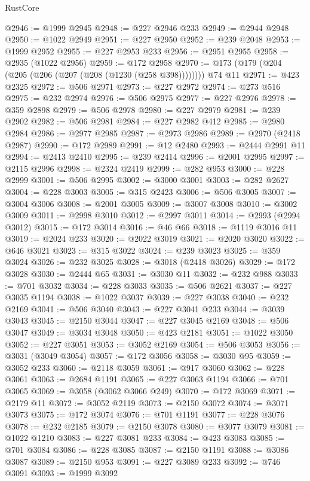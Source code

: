 \begin{lexlean}{RustCore}
\begin{coremodule}
@2946 := @1999 @2945
@2948 := @227 @2946 @233
@2949 := @2944 @2948
@2950 := @1022 @2949
@2951 := @227 @2950
@2952 := @239 @2048
@2953 := @1999 @2952
@2955 := @227 @2953 @233
@2956 := @2951 @2955
@2958 := @2935 (@1022 @2956)
@2959 := @172 @2958
@2970 := @173 (@179 (@204 (@205 (@206 (@207 (@208 (@1230 (@258 @398)))))))) @74 @11
@2971 := @423 @2325
@2972 := @506 @2971
@2973 := @227 @2972
@2974 := @273 @516
@2975 := @232 @2974
@2976 := @506 @2975
@2977 := @227 @2976
@2978 := @359 @2898
@2979 := @506 @2978
@2980 := @227 @2979
@2981 := @239 @2902
@2982 := @506 @2981
@2984 := @227 @2982 @412
@2985 := @2980 @2984
@2986 := @2977 @2985
@2987 := @2973 @2986
@2989 := @2970 (@2418 @2987)
@2990 := @172 @2989
@2991 := @12 @2480
@2993 := @2444 @2991 @11
@2994 := @2413 @2410
@2995 := @239 @2414
@2996 := @2001 @2995
@2997 := @2115 @2996
@2998 := @2324 @2419
@2999 := @282 @953
@3000 := @228 @2999
@3001 := @506 @2995
@3002 := @3000 @3001
@3003 := @282 @2627
@3004 := @228 @3003
@3005 := @315 @2423
@3006 := @506 @3005
@3007 := @3004 @3006
@3008 := @2001 @3005
@3009 := @3007 @3008
@3010 := @3002 @3009
@3011 := @2998 @3010
@3012 := @2997 @3011
@3014 := @2993 (@2994 @3012)
@3015 := @172 @3014
@3016 := @46 @66
@3018 := @1119 @3016 @11
@3019 := @2024 @233
@3020 := @2022 @3019
@3021 := @2020 @3020
@3022 := @646 @3021
@3023 := @315 @3022
@3024 := @239 @3023
@3025 := @359 @3024
@3026 := @232 @3025
@3028 := @3018 (@2418 @3026)
@3029 := @172 @3028
@3030 := @2444 @65
@3031 := @3030 @11
@3032 := @232 @988
@3033 := @701 @3032
@3034 := @228 @3033
@3035 := @506 @2621
@3037 := @227 @3035 @1194
@3038 := @1022 @3037
@3039 := @227 @3038
@3040 := @232 @2169
@3041 := @506 @3040
@3043 := @227 @3041 @233
@3044 := @3039 @3043
@3045 := @2150 @3044
@3047 := @227 @3045 @2169
@3048 := @506 @3047
@3049 := @3034 @3048
@3050 := @423 @2181
@3051 := @1022 @3050
@3052 := @227 @3051
@3053 := @3052 @2169
@3054 := @506 @3053
@3056 := @3031 (@3049 @3054)
@3057 := @172 @3056
@3058 := @3030 @95
@3059 := @3052 @233
@3060 := @2118 @3059
@3061 := @917 @3060
@3062 := @228 @3061
@3063 := @2684 @1191
@3065 := @227 @3063 @1194
@3066 := @701 @3065
@3069 := @3058 (@3062 @3066 @249)
@3070 := @172 @3069
@3071 := @2179 @11
@3072 := @3052 @2119
@3073 := @2150 @3072
@3074 := @3071 @3073
@3075 := @172 @3074
@3076 := @701 @1191
@3077 := @228 @3076
@3078 := @232 @2185
@3079 := @2150 @3078
@3080 := @3077 @3079
@3081 := @1022 @1210
@3083 := @227 @3081 @233
@3084 := @423 @3083
@3085 := @701 @3084
@3086 := @228 @3085
@3087 := @2150 @1191
@3088 := @3086 @3087
@3089 := @2150 @953
@3091 := @227 @3089 @233
@3092 := @746 @3091
@3093 := @1999 @3092

\end{coremodule}
\end{lexlean}
